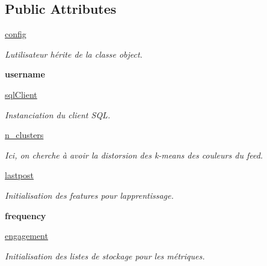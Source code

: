 \subsection*{Public Attributes}
\begin{DoxyCompactItemize}
\item 
\mbox{\hyperlink{classuser_1_1_user_a40419b31c47368b454fa2003b5df9307}{config}}
\begin{DoxyCompactList}\small\item\em L\textquotesingle{}utilisateur hérite de la classe {\ttfamily object}. \end{DoxyCompactList}\item 
\mbox{\label{classuser_1_1_user_a22920e0da789e7da4462f98d18f0d5f1}} 
{\bfseries username}
\item 
\mbox{\hyperlink{classuser_1_1_user_adf4a399faa3ea66427ecf7cb8a1bbb89}{sql\+Client}}
\begin{DoxyCompactList}\small\item\em Instanciation du client S\+QL. \end{DoxyCompactList}\item 
\mbox{\hyperlink{classuser_1_1_user_ad3a0ba5c1d994eef3cc7a0c5de2bfa85}{n\+\_\+clusters}}
\begin{DoxyCompactList}\small\item\em Ici, on cherche à avoir la distorsion des k-\/means des couleurs du feed. \end{DoxyCompactList}\item 
\mbox{\hyperlink{classuser_1_1_user_a31bd1f48a5a64a4319d8d93beca49706}{lastpost}}
\begin{DoxyCompactList}\small\item\em Initialisation des features pour l\textquotesingle{}apprentissage. \end{DoxyCompactList}\item 
\mbox{\label{classuser_1_1_user_a95227c69ec5585fd19625ffdb5c3b739}} 
{\bfseries frequency}
\item 
\mbox{\hyperlink{classuser_1_1_user_a7e0889f882283a613c48be7c1c5802cb}{engagement}}
\begin{DoxyCompactList}\small\item\em Initialisation des listes de stockage pour les métriques. \end{DoxyCompactList}\item 
\mbox{\label{classuser_1_1_user_ab7e01826b02c1fd36fe40ec3ef122619}} 

\end{DoxyCompactItemize}
